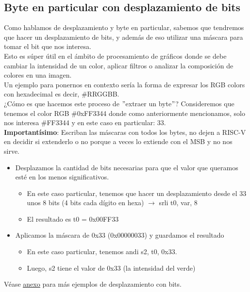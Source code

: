 \documentclass[10pt,a4paper]{article}
\begin{document}
\subsection*{Byte en particular con desplazamiento de bits}
\label{subsec:byte_particular_desplazamiento}
Como hablamos de desplazamiento y byte en particular, sabemos que tendremos que hacer un desplazamiento de bits, y además de eso utilizar una máscara para tomar el bit que nos interesa. \\ 

Esto es súper útil en el ámbito de procesamiento de gráficos donde se debe cambiar la intensidad de un color, aplicar filtros o analizar la composición de colores en una imagen. \\

Un ejemplo para ponernos en contexto sería la forma de expresar los RGB colors con hexadecimal es decir, \#RRGGBB. \\
¿Cómo es que hacemos este proceso de $"$extraer un byte$"$? Consideremos que tenemos el color RGB \#0xFF3344 donde como anteriormente mencionamos, solo nos interesa \#FF3344 y en este caso en particular: 33. \\
\textbf{Importantísimo}: Escriban las máscaras con todos los bytes, no dejen a RISC-V en decidir si extenderlo o no porque a veces lo extiende con el MSB y no nos sirve.
\begin{itemize}
    \item Desplazamos la cantidad de bits necesarias para que el valor que queramos esté en los menos significativos.
    \begin{itemize}
        \item En este caso particular, tenemos que hacer un desplazamiento desde el 33 unos 8 bits (4 bits cada dígito en hexa) $ \rightarrow $ srli t0, var, 8
        \item El resultado es t0 = 0x00FF33
    \end{itemize}
    \item Aplicamos la máscara de 0x33 (0x00000033) y guardamos el resultado
    \begin{itemize}
        \item En este caso particular, tenemos andi s2, t0, 0x33.
        \item Luego, s2 tiene el valor de 0x33 (la intensidad del verde)
    \end{itemize}
\end{itemize} 
Véase \hyperref[subsec:desplazamiento_bits]{\underline{anexo}} para más ejemplos de desplazamiento con bits.
\end{document}
